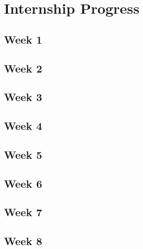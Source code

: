 \section{Internship Progress}
\subsection{Week 1}
\subsection{Week 2}
\subsection{Week 3}
\subsection{Week 4}
\subsection{Week 5}
\subsection{Week 6}
\subsection{Week 7}
\subsection{Week 8}
